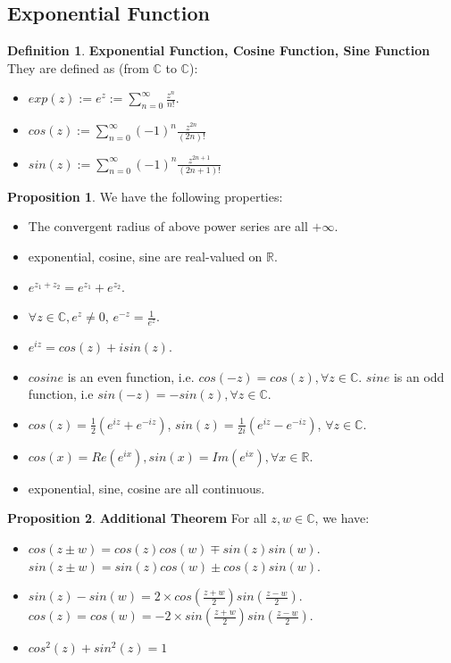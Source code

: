\documentclass{article}
\theoremstyle{definition}
\newtheorem{defi}{Definition}[subsection]
\newtheorem{prop}{Proposition}[subsection]
\begin{document}
\subsection{Exponential Function}
\begin{defi}
\textbf{Exponential Function, Cosine Function, Sine Function} They are defined as (from $\mathbb{C}$ to $\mathbb{C}$):
\begin{itemize}
    \item $exp(z) := e^z := \sum_{n=0}^{\infty}\frac{z^n}{n!}$.
    \item $cos(z) := \sum_{n=0}^{\infty}(-1)^{n}\frac{z^{2n}}{(2n)!}$
    \item $sin(z) := \sum_{n=0}^{\infty}(-1)^{n}\frac{z^{2n+1}}{(2n+1)!}$
\end{itemize}
\end{defi}
\begin{prop}
We have the following properties:
\begin{itemize}
    \item The convergent radius of above power series are all $+\infty$.
    \item exponential, cosine, sine are real-valued on $\mathbb{R}$.
    \item $e^{z_1+z_2}=e^{z_1}+e^{z_2}$.
    \item $\forall z \in \mathbb{C}, e^z \neq 0$, $e^{-z}=\frac{1}{e^z}$.
    \item $e^{iz}=cos(z)+isin(z)$.
    \item $cosine$ is an even function, i.e. $cos(-z)=cos(z), \forall z\in\mathbb{C}$. $sine$ is an odd function, i.e $sin(-z)=-sin(z), \forall z\in\mathbb{C}$.
    \item $cos(z)=\frac{1}{2}(e^{iz}+e^{-iz})$, $sin(z)=\frac{1}{2i}(e^{iz}-e^{-iz})$, $\forall z\in\mathbb{C}$.
    \item $cos(x)=Re(e^{ix}), sin(x)=Im(e^{ix}), \forall x\in\mathbb{R}$.
    \item exponential, sine, cosine are all continuous.
\end{itemize}
\end{prop}
\begin{prop}
\textbf{Additional Theorem} For all $z,w\in\mathbb{C}$, we have:
\begin{itemize}
    \item $cos(z\pm w)=cos(z)cos(w)\mp sin(z)sin(w)$.
    $sin(z\pm w) = sin(z)cos(w)\pm cos(z)sin(w)$.
    \item $sin(z)-sin(w)=2\times cos(\frac{z+w}{2})sin(\frac{z-w}{2})$. $cos(z)=cos(w)=-2\times sin(\frac{z+w}{2})sin(\frac{z-w}{2})$.
    \item $cos^{2}(z)+sin^{2}(z)=1$
\end{itemize}
\end{prop}
\end{document}
